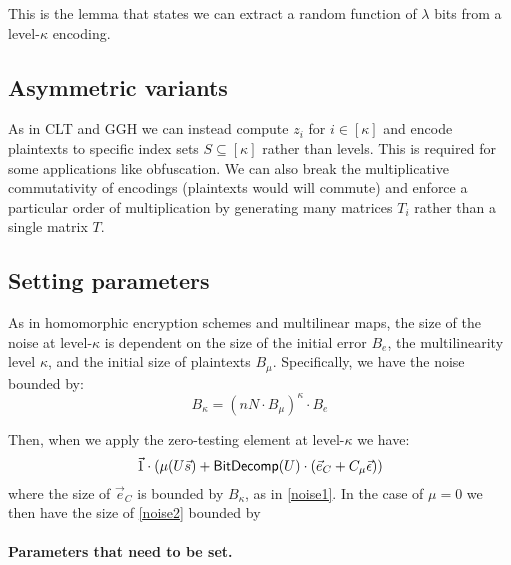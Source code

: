\begin{lemma}
\label{extraction}
This is the lemma that states we can extract a random function of $\lambda$ bits from a level-$\kappa$ encoding.
\end{lemma}

\subsection{Asymmetric variants}

As in CLT and GGH we can instead compute $z_i$ for $i \in [\kappa]$ and encode plaintexts to specific index sets $S \subseteq [\kappa]$ rather than levels.  This is required for some applications like obfuscation.  We can also break the multiplicative commutativity of encodings (plaintexts would will commute) and enforce a particular order of multiplication by generating many matrices $T_i$ rather than a single matrix $T$.

\subsection{Setting parameters}

As in homomorphic encryption schemes and multilinear maps, the size of the noise at level-$\kappa$ is dependent on the size of the initial error $B_e$, the multilinearity level $\kappa$, and the initial size of plaintexts $B_\mu$.  Specifically, we have the noise bounded by:
\begin{equation}
\label{noise1}
B_\kappa = (nN\cdot B_\mu)^\kappa \cdot B_e
\end{equation}

Then, when we apply the zero-testing element at level-$\kappa$ we have:
\begin{equation}
\label{noise2}
\vec{1}\cdot(\mu(U \vec{s}) + \mathsf{BitDecomp}(U)\cdot (\vec{e}_C + C_\mu\vec{\epsilon}))\\
\end{equation}
where the size of $\vec{e}_C$ is bounded by $B_\kappa$, as in \eqref{noise1}.  In the case of $\mu = 0$ we then have the size of \eqref{noise2} bounded by 

\paragraph{Parameters that need to be set.}

